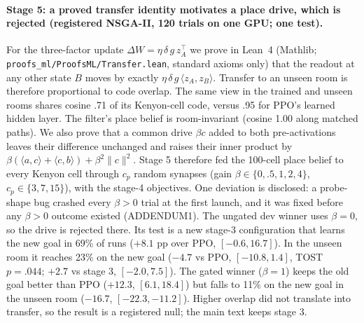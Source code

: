 \documentclass[10pt,onecolumn,letterpaper]{article}
\begin{document}
\paragraph{Stage 5: a proved transfer identity motivates a place drive, which is rejected (registered NSGA-II, 120 trials on one GPU; one test).}
For the three-factor update $\Delta W=\eta\,\delta\,g\,z_A^\top$ we prove in Lean~4 (Mathlib; \texttt{proofs\_ml/ProofsML/Transfer.lean},
standard axioms only) that the readout at any other state $B$ moves by exactly $\eta\,\delta\,g\,\langle z_A,z_B\rangle$. Transfer
to an unseen room is therefore proportional to code overlap. The same view in the trained and unseen rooms shares cosine .71 of its
Kenyon-cell code, versus .95 for PPO's learned hidden layer. The filter's place belief is room-invariant (cosine 1.00 along matched
paths). We also prove that a common drive $\beta c$ added to both pre-activations leaves their difference unchanged and raises
their inner product by $\beta(\langle a,c\rangle+\langle c,b\rangle)+\beta^2\|c\|^2$. Stage 5 therefore fed the 100-cell place belief to every Kenyon
cell through $c_p$ random synapses (gain $\beta\in\{0,.5,1,2,4\}$, $c_p\in\{3,7,15\}$), with the stage-4 objectives. One deviation
is disclosed: a probe-shape bug crashed every $\beta>0$ trial at the first launch, and it was fixed before any $\beta>0$ outcome
existed (ADDENDUM1). The ungated dev winner uses $\beta=0$, so the drive is rejected there. Its test is a new stage-3 configuration
that learns the new goal in 69\% of runs ($+8.1$ pp over PPO, $[-0.6,16.7]$). In the unseen room it reaches 23\% on the new goal
($-4.7$ vs PPO, $[-10.8,1.4]$, TOST $p=.044$; $+2.7$ vs stage 3, $[-2.0,7.5]$). The gated winner ($\beta=1$) keeps the old goal
better than PPO ($+12.3$, $[6.1,18.4]$) but falls to 11\% on the new goal in the unseen room ($-16.7$, $[-22.3,-11.2]$). Higher
overlap did not translate into transfer, so the result is a registered null; the main text keeps stage 3.
\end{document}

